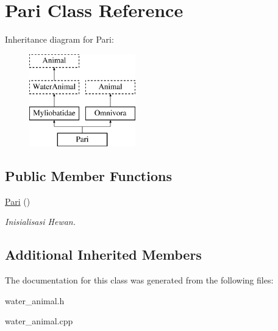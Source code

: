 \hypertarget{class_pari}{}\section{Pari Class Reference}
\label{class_pari}
Inheritance diagram for Pari\+:\begin{figure}[H]
\begin{center}
\leavevmode
\includegraphics[height=4.000000cm]{class_pari}
\end{center}
\end{figure}
\subsection*{Public Member Functions}
\begin{DoxyCompactItemize}
\item 
\hyperlink{class_pari_a5a119732b193e06037a00456c6606c35}{Pari} ()\hypertarget{class_pari_a5a119732b193e06037a00456c6606c35}{}\label{class_pari_a5a119732b193e06037a00456c6606c35}

\begin{DoxyCompactList}\small\item\em Inisialisasi Hewan. \end{DoxyCompactList}\end{DoxyCompactItemize}
\subsection*{Additional Inherited Members}


The documentation for this class was generated from the following files\+:\begin{DoxyCompactItemize}
\item 
water\+\_\+animal.\+h\item 
water\+\_\+animal.\+cpp\end{DoxyCompactItemize}
